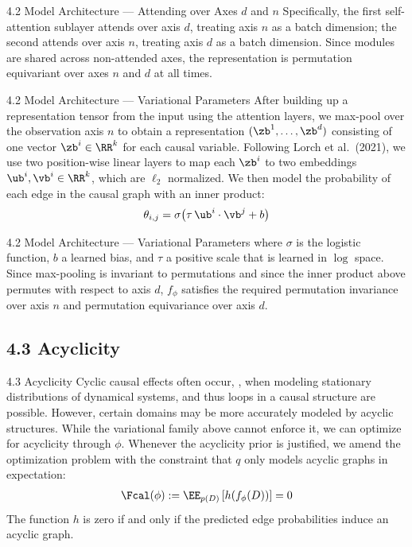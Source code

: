 \documentclass[aspectratio=169,10pt]{beamer}
\begin{document}
\begin{frame}{4.2 Model Architecture --- Attending over Axes $d$ and $n$}
Specifically, the first self-attention sublayer attends over axis $d$, treating axis $n$ as a batch dimension; the second attends over axis $n$, treating axis $d$ as a batch dimension. Since modules are shared across non-attended axes, the representation is permutation equivariant over axes $n$ and $d$ at all times.
\end{frame}

\begin{frame}{4.2 Model Architecture --- Variational Parameters}
After building up a representation tensor from the input using the attention layers, we max-pool over the observation axis $n$ to obtain a representation $(\zb^1, \dots, \zb^d)$ consisting of one vector $\zb^i \in \RR^k $ for each causal variable. Following Lorch et al.\ (2021), we use two position-wise linear layers to map each $\zb^i$ to two embeddings $\ub^i, \vb^i \in \RR^{k}$, which are $\ell_2$ normalized. We then model the probability of each edge in the causal graph with an inner product:
\begin{align*}
    \theta_{i,j} = \sigma
    \big(\tau \, \ub^i \cdot \vb^j + b \big)
\end{align*}
\end{frame}

\begin{frame}{4.2 Model Architecture --- Variational Parameters}
where $\sigma$ is the logistic function, $b$ a learned bias, and $\tau$ a positive scale that is learned in $\log$ space. Since max-pooling is invariant to permutations and since the inner product above permutes with respect to axis $d$, $f_\phi$ satisfies the required permutation invariance over axis $n$ and permutation equivariance over axis $d$.
\end{frame}

\subsection{4.3 Acyclicity}

\begin{frame}{4.3 Acyclicity}
Cyclic causal effects often occur, \eg, when modeling stationary distributions of dynamical systems, and thus loops in a causal structure are possible. However, certain domains may be more accurately modeled by acyclic structures. While the variational family above cannot enforce it, we can optimize for acyclicity through $\phi$. Whenever the acyclicity prior is justified, we amend the optimization problem with the constraint that $q$ only models acyclic graphs in expectation:
\begin{align*}
    \Fcal(\phi) := \EE_{p(D)} \left[ h(f_\phi(D)) \right] = 0
\end{align*}
The function $h$ is zero if and only if the predicted edge probabilities induce an acyclic graph.
\end{frame}
\end{document}
